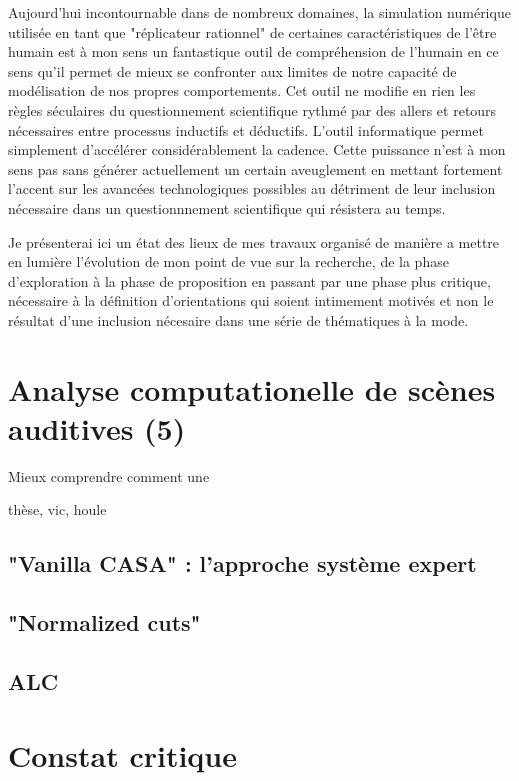 Aujourd'hui incontournable dans de nombreux domaines, la simulation numérique utilisée en tant que "réplicateur rationnel" de certaines caractéristiques de l'être humain est à mon sens un fantastique outil de compréhension de l'humain en ce sens qu'il permet de mieux se confronter aux limites de notre capacité de modélisation de nos propres comportements. Cet outil ne modifie en rien les règles séculaires du questionnement scientifique rythmé par des allers et retours nécessaires entre processus inductifs et déductifs. L'outil informatique permet simplement d'accélérer considérablement la cadence. Cette puissance n'est à mon sens pas sans générer actuellement un certain aveuglement en mettant fortement l'accent sur les avancées technologiques possibles au détriment de leur inclusion nécessaire dans un questionnnement scientifique qui résistera au temps.

Je présenterai ici un état des lieux de mes travaux organisé de manière a mettre en lumière l'évolution de mon point de vue sur la recherche, de la phase d'exploration à la phase de proposition en passant par une phase plus critique, nécessaire à la définition d'orientations qui soient intimement motivés et non le résultat d'une inclusion nécesaire dans une série de thématiques à la mode.

\section{Analyse computationelle de scènes auditives (5)}

Mieux comprendre comment une

thèse, vic, houle

\subsection{"Vanilla CASA" : l'approche système expert}

\subsection{"Normalized cuts"}

\subsection{ALC}



\section{Constat critique}

